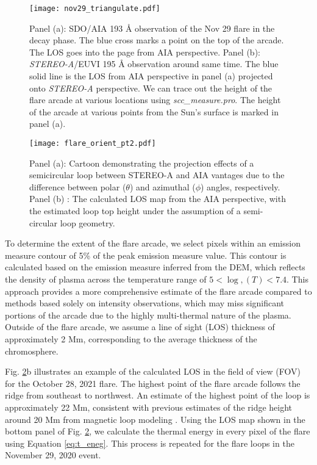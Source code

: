 \begin{figure}[ht!]
    \centering
    \texttt{[image: nov29\_triangulate.pdf]}
    \caption{Panel (a): SDO/AIA 193 {\AA} observation of the Nov 29 flare in the decay phase. The blue cross marks a point on the top of the arcade. The LOS goes into the page from AIA perspective. Panel (b): {\it STEREO-A}/EUVI 195 {\AA} observation around same time. The blue solid line is the LOS from AIA perspective in panel (a) projected onto {\it STEREO-A} perspective. We can trace out the height of the flare arcade at various locations using \textit{scc\_measure.pro}. The height of the arcade at various points from the Sun's surface is marked in panel (a).}
    \label{fig:flare_orient2}
    \end{figure}

\begin{figure}[ht!]
    \centering
    \texttt{[image: flare\_orient\_pt2.pdf]}
    \caption{Panel (a): Cartoon demonstrating the projection effects of a semicircular loop between STEREO-A and AIA vantages due to the difference between polar ($\theta$) and azimuthal ($\phi$) angles, respectively. Panel (b) : The calculated LOS map from the AIA perspective, with the estimated loop top height under the assumption of a semi-circular loop geometry.}
    \label{fig:flare_orient_2}
\end{figure}

To determine the extent of the flare arcade, we select pixels within an emission measure contour of 5\% of the peak emission measure value. This contour is calculated based on the emission measure inferred from the DEM, which reflects the density of plasma across the temperature range of $5<\log,(T)<7.4$. This approach provides a more comprehensive estimate of the flare arcade compared to methods based solely on intensity observations, which may miss significant portions of the arcade due to the highly multi-thermal nature of the plasma. Outside of the flare arcade, we assume a line of sight (LOS) thickness of approximately 2 Mm, corresponding to the average thickness of the chromosphere.

Fig. \ref{fig:flare_orient_2}b illustrates an example of the calculated LOS in the field of view (FOV) for the October 28, 2021 flare. The highest point of the flare arcade follows the ridge from southeast to northwest. An estimate of the highest point of the loop is approximately 22 Mm, consistent with previous estimates of the ridge height around 20 Mm from magnetic loop modeling \citep{longcope22}. Using the LOS map shown in the bottom panel of Fig. \ref{fig:flare_orient_2}, we calculate the thermal energy in every pixel of the flare using Equation \ref{eq:t_eneg}. This process is repeated for the flare loops in the November 29, 2020 event.

